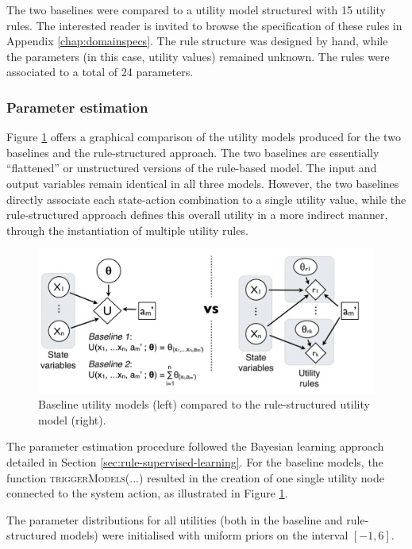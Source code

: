 The two baselines were compared to a utility model structured with 15 utility rules. The interested reader is invited to browse the specification of these rules in Appendix \ref{chap:domainspecs}. The rule structure was designed by hand, while the parameters (in this case, utility values) remained unknown. The rules were associated to a total of 24 parameters. 

\subsubsection*{Parameter estimation}

Figure \ref{fig:exp1_baselines} offers a graphical comparison of the utility models produced for the two baselines and the rule-structured approach.  The two baselines are essentially ``flattened'' or unstructured versions of the rule-based model.  The input and output variables remain identical in all three models. However, the two baselines directly associate each state-action combination to a single utility value, while the rule-structured approach defines this overall utility in a more indirect manner, through the instantiation of multiple utility rules. 

\begin{figure}[h]
\centering
\includegraphics[scale=0.40]{imgs/exp1_baselines.pdf}
\caption{Baseline utility models (left) compared to the rule-structured utility model (right).}
\label{fig:exp1_baselines}
\end{figure}


The parameter estimation procedure followed the Bayesian learning approach detailed in Section \ref{sec:rule-supervised-learning}. For the baseline models, the function \textsc{triggerModels}(...) resulted in the creation of one single utility node connected to the system action, as illustrated in Figure \ref{fig:exp1_baselines}. 

The parameter distributions for all utilities (both in the baseline and rule-structured models) were initialised with uniform priors on the interval $[-1,6]$.

